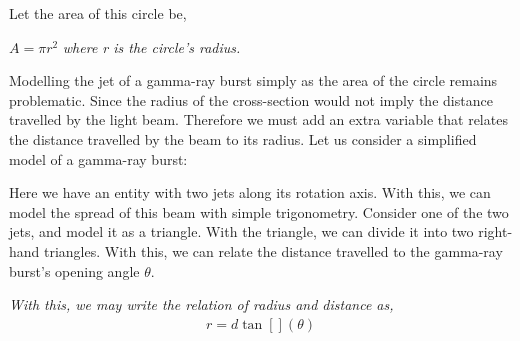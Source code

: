 \documentclass{article}
\begin{document}
\begin{center}
\end{center}	

Let the area of this circle be,
\begin{center}  $A = \pi r^2 $ \textit{where r is the circle's radius.}
\end{center}
Modelling the jet of a gamma-ray burst simply as the area of the circle remains problematic. Since the radius of the cross-section would not imply the distance travelled by the light beam. Therefore we must add an extra variable that relates the distance travelled by the beam to its radius. Let us consider a simplified model of a gamma-ray burst:

\begin{center}
\end{center}

Here we have an entity with two jets along its rotation axis. With this, we can model the spread of this beam with simple trigonometry. Consider one of the two jets, and model it as a triangle. With the triangle, we can divide it into two right-hand triangles. With this, we can relate the distance travelled to the gamma-ray burst's opening angle $\theta$.
\begin{center}
\end{center}
\textit{With this, we may write the relation of radius and distance as,}
\begin{gather*}
	r = d\tan[](\theta)
\end{gather*}
\end{document}
